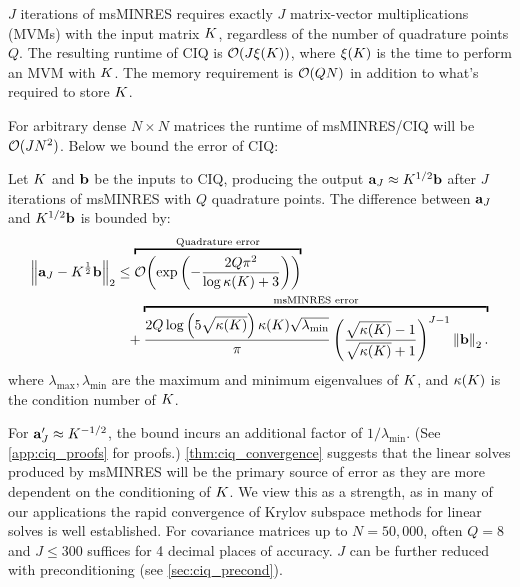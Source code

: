 \begin{property}
  $J$ iterations of msMINRES requires exactly $J$ matrix-vector multiplications (MVMs) with the input matrix $K$,
  regardless of the number of quadrature points $Q$.
  The resulting runtime of CIQ is $\bigo{ J \mvm{\bK}}$, where $\xi ( K )$ is the time to perform an MVM with $K$.
  The memory requirement is $\bigo{ QN }$ in addition to what's required to store $K$.
  \label{prop:msminres}
\end{property}
%
\noindent
For arbitrary dense $N \! \times \! N$ matrices the runtime of msMINRES/CIQ will be $\bigo{J N^2}$.
Below we bound the error of CIQ:
%
\begin{theorem}
  Let $K$ and $\mathbf{b}$ be the inputs to CIQ, producing the output $\mathbf{a}_J \approx K^{1/2} \mathbf{b}$ after $J$ iterations of msMINRES with $Q$ quadrature points.
  The difference between $\mathbf{a}_J$ and $K^{1/2} \mathbf{b}$ is bounded by:
  \begin{align*}
    \left\Vert \ba_J - \bK^{\frac 1 2} \bb \right\Vert_2
    &\leq
    \overbracket{
      \bigo{\exp\left( -\frac  {2 Q \pi^2}{\log \kappa(\bK) + 3} \right)}
    }^{\text{Quadrature error}}
    \\
    &\phantom{=} +
    \overbracket{
      \frac{ 2 Q \log \left( 5 \sqrt{\kappa(\bK)} \right)  \kappa(\bK) \sqrt{\lambda_\text{min}} } { \pi }
      \left( \frac{ \sqrt{\kappa(\bK)} - 1}{ \sqrt{\kappa(\bK)} + 1} \right)^{J-1}
      \left\Vert \bb \right\Vert_2.
    }^{\text{msMINRES error}}
  \end{align*}
  where $\lambda_\text{max},\lambda_{\text{min}}$ are the maximum and minimum eigenvalues of $K$, and $\kappa(K)$ is the condition number of $K$.
  \label{thm:ciq_convergence}
\end{theorem}
%
\noindent
For $\mathbf{a}'_J \approx K^{-1/2}$, the bound incurs an additional factor of $1/\lambda_\text{min}$.
(See \cref{app:ciq_proofs} for proofs.)
\cref{thm:ciq_convergence} suggests that the linear solves produced by msMINRES will be the primary source of error as they are more dependent on the conditioning of $K$.
We view this as a strength, as in many of our applications the rapid convergence of Krylov subspace methods for linear solves is well established.
For covariance matrices up to $N=50,\!000$, often $Q=8$ and $J\leq300$ suffices for 4 decimal places of accuracy.
$J$ can be further reduced with preconditioning (see \cref{sec:ciq_precond}).



